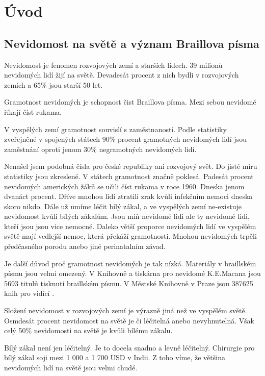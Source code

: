 
\chapter{Úvod}

\section{Nevidomost na světě a význam Braillova písma}

Nevidomost je fenomen rozvojových zemí a starších lidech. 39 milionů nevidomých lidí žijí na světě. Devadesát procent z nich bydli v rozvojových zemích a 65\% jsou starší 50 let\citep{whodata}.

Gramotnost nevidomých je schopnost čist Braillova písma.  Mezi sebou nevidomé říkají číst rukama.

V vyspělých zemí gramotnost souvislí s zaměstnaností. Podle statistiky zveřejněné v spojených státech 90\% procent gramotných nevidomých lidí jsou zaměstnání oproti jenom 30\% negramotných nevidomých lidí.

Nenašel jsem podobná čísla pro české republiky ani rozvojový svět.  Do jisté míru statistiky jsou zkreslené.  V státech gramotnost značně poklesá.  Padesát procent nevidomých amerických žáků se učili číst rukama v roce 1960. Dneska jenom dvanáct procent.  Dříve mnohou lidí ztratili zrak kvůli infekčním nemoci dneska skoro nikdo. Dále už umíme léčit bílý zákal, a ve vyspělých zemí ne-existuje nevidomost kvůli bílých zákalům.  Jsou miň nevidomé lidi ale ty nevidomé lidi, kteří jsou jsou vice nemocné.  Daleko větší proporce nevidomých lidí ve vyspělém světě mají vedlejší nemoc, která překáží gramotnosti.  Mnohou nevidomých trpěli předčasného porodu anebo jiné perinatalním závad\citep{perkins,whozakal,whodata}.

Je další důvod proč gramotnost nevidomých je tak nízká.  Materiály v braillském písmu jsou velmi omezený.  V Knihovně a tiskárna pro nevidomé K.E.Macana jsou 5693 titulů tisknutí braillském písmu\citep{biblio}. V Městské Knihovně v Praze jsou 387625 knih pro vidící \citep{mlp}.

Složení nevidomost v rozvojových zemí je výrazně jiná než ve vyspělém světě. Osmdesát procent nevidomost na světě je či léčitelná anebo nevyhnutelná\citep{whodata}.  Však celý 50\% nevidomosti na světě je kvůli bílému zákalu\citep{whozakal}.

Bílý zákal není jen léčitelný. Je to docela snadno a levně léčitelný. Chirurgie pro bílý zákal soji mezi 1 000 a 1 700 USD v Indii\citep{cataractsindia}. Z toho víme, že většina nevidomých lidí na světě jsou velmi chudé.
\clearpage


